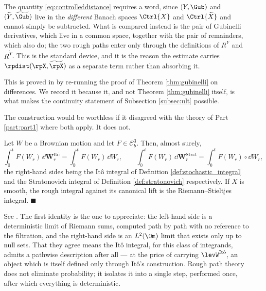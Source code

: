 The quantity \eqref{eq:controlleddistance} requires a word, since $(Y,\Gub)$ and
$(\widetilde Y,\widetilde\Gub)$ live in the \emph{different} Banach spaces $\Ctrl{X}$ and
$\Ctrl{\widetilde X}$ and cannot simply be subtracted. What is compared instead is the pair of
Gubinelli derivatives, which live in a common space, together with the pair of remainders, which
also do; the two rough paths enter only through the definitions of $R^Y$ and $R^{\widetilde Y}$.
This is the standard device, and it is the reason the estimate carries $\rpdist(\rpX,\widetilde\rpX)$
as a separate term rather than absorbing it.

This is proved in \cite[Thm.\ 4.17]{frizhairer2020} by re-running the proof of Theorem
\ref{thm:gubinelli} on differences. We record it because it, and not Theorem \ref{thm:gubinelli}
itself, is what makes the continuity statement of Subsection \ref{subsec:ult} possible.

The construction would be worthless if it disagreed with the theory of Part \ref{part:part1} where
both apply. It does not.

\begin{proposition}[Consistency]\label{prop:consistency}
Let $W$ be a Brownian motion and let $F \in \mathcal{C}^3_b$. Then, almost surely,
\begin{equation}\label{eq:consistency}
\int_0^t F(W_r)\,\dd\mathbf{W}^{\mathrm{It\hat o}}_r = \int_0^t F(W_r)\,\dd W_r,
\qquad
\int_0^t F(W_r)\,\dd\mathbf{W}^{\mathrm{Strat}}_r = \int_0^t F(W_r)\circ \dd W_r,
\end{equation}
the right-hand sides being the Itô integral of Definition \ref{def:stochastic_integral} and the
Stratonovich integral of Definition \ref{def:stratonovich} respectively. If $X$ is smooth, the rough integral against its canonical lift
is the Riemann--Stieltjes integral. \hfill $\blacksquare$
\end{proposition}

See \cite[Ch.\ 5]{frizhairer2020}. The first identity is the one to appreciate: the left-hand side
is a deterministic limit of Riemann sums, computed path by path with no reference to the filtration,
and the right-hand side is an $L^2(\Om)$ limit that exists only up to null sets. That they agree
means the Itô integral, for this class of integrands, admits a pathwise description after all --- at
the price of carrying $\levW^{\mathrm{It\hat o}}$, an object which is itself defined only through
Itô's construction. Rough path theory does not eliminate probability; it isolates it into a single
step, performed once, after which everything is deterministic.

